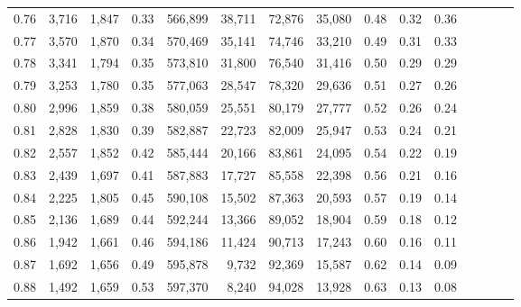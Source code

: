 \begin{tabular}{rrrcrrrrrrrrrrr}
0.76 &  3,716 &  1,847 &                                       0.33 &  566,899 &   38,711 &   72,876 &   35,080 &  0.48 &  0.32 &                         0.36 \\
0.77 &  3,570 &  1,870 &                                       0.34 &  570,469 &   35,141 &   74,746 &   33,210 &  0.49 &  0.31 &                         0.33 \\
0.78 &  3,341 &  1,794 &                                       0.35 &  573,810 &   31,800 &   76,540 &   31,416 &  0.50 &  0.29 &                         0.29 \\
0.79 &  3,253 &  1,780 &                                       0.35 &  577,063 &   28,547 &   78,320 &   29,636 &  0.51 &  0.27 &                         0.26 \\
0.80 &  2,996 &  1,859 &                                       0.38 &  580,059 &   25,551 &   80,179 &   27,777 &  0.52 &  0.26 &                         0.24 \\
0.81 &  2,828 &  1,830 &                                       0.39 &  582,887 &   22,723 &   82,009 &   25,947 &  0.53 &  0.24 &                         0.21 \\
0.82 &  2,557 &  1,852 &                                       0.42 &  585,444 &   20,166 &   83,861 &   24,095 &  0.54 &  0.22 &                         0.19 \\
0.83 &  2,439 &  1,697 &                                       0.41 &  587,883 &   17,727 &   85,558 &   22,398 &  0.56 &  0.21 &                         0.16 \\
0.84 &  2,225 &  1,805 &                                       0.45 &  590,108 &   15,502 &   87,363 &   20,593 &  0.57 &  0.19 &                         0.14 \\
0.85 &  2,136 &  1,689 &                                       0.44 &  592,244 &   13,366 &   89,052 &   18,904 &  0.59 &  0.18 &                         0.12 \\
0.86 &  1,942 &  1,661 &                                       0.46 &  594,186 &   11,424 &   90,713 &   17,243 &  0.60 &  0.16 &                         0.11 \\
0.87 &  1,692 &  1,656 &                                       0.49 &  595,878 &    9,732 &   92,369 &   15,587 &  0.62 &  0.14 &                         0.09 \\
0.88 &  1,492 &  1,659 &                                       0.53 &  597,370 &    8,240 &   94,028 &   13,928 &  0.63 &  0.13 &                         0.08 \\

\end{tabular}

